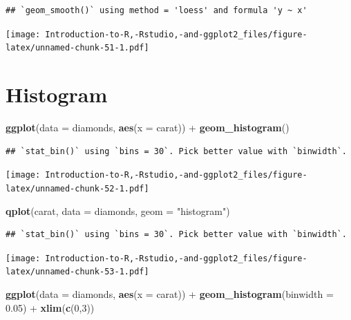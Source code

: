 \documentclass[]{book}
\newenvironment{Shaded}{\begin{snugshade}}{\end{snugshade}}
\newcommand{\KeywordTok}[1]{\textcolor[rgb]{0.13,0.29,0.53}{\textbf{{#1}}}}
\newcommand{\DataTypeTok}[1]{\textcolor[rgb]{0.13,0.29,0.53}{{#1}}}
\newcommand{\DecValTok}[1]{\textcolor[rgb]{0.00,0.00,0.81}{{#1}}}
\newcommand{\FloatTok}[1]{\textcolor[rgb]{0.00,0.00,0.81}{{#1}}}
\newcommand{\StringTok}[1]{\textcolor[rgb]{0.31,0.60,0.02}{{#1}}}
\newcommand{\NormalTok}[1]{{#1}}
\begin{document}
\begin{verbatim}
## `geom_smooth()` using method = 'loess' and formula 'y ~ x'
\end{verbatim}

\texttt{[image: Introduction-to-R,-Rstudio,-and-ggplot2\_files/figure-latex/unnamed-chunk-51-1.pdf]}

\section{Histogram}\label{histogram}

\begin{Shaded}
\begin{Highlighting}[]
\KeywordTok{ggplot}\NormalTok{(}\DataTypeTok{data =} \NormalTok{diamonds, }\KeywordTok{aes}\NormalTok{(}\DataTypeTok{x =} \NormalTok{carat)) +}\StringTok{ }\KeywordTok{geom_histogram}\NormalTok{()}
\end{Highlighting}
\end{Shaded}

\begin{verbatim}
## `stat_bin()` using `bins = 30`. Pick better value with `binwidth`.
\end{verbatim}

\texttt{[image: Introduction-to-R,-Rstudio,-and-ggplot2\_files/figure-latex/unnamed-chunk-52-1.pdf]}

\begin{Shaded}
\begin{Highlighting}[]
\KeywordTok{qplot}\NormalTok{(carat, }\DataTypeTok{data =} \NormalTok{diamonds, }\DataTypeTok{geom =} \StringTok{"histogram"}\NormalTok{)}
\end{Highlighting}
\end{Shaded}

\begin{verbatim}
## `stat_bin()` using `bins = 30`. Pick better value with `binwidth`.
\end{verbatim}

\texttt{[image: Introduction-to-R,-Rstudio,-and-ggplot2\_files/figure-latex/unnamed-chunk-53-1.pdf]}

\begin{Shaded}
\begin{Highlighting}[]
\KeywordTok{ggplot}\NormalTok{(}\DataTypeTok{data =} \NormalTok{diamonds, }\KeywordTok{aes}\NormalTok{(}\DataTypeTok{x =} \NormalTok{carat)) +}\StringTok{ }\KeywordTok{geom_histogram}\NormalTok{(}\DataTypeTok{binwidth =} \FloatTok{0.05}\NormalTok{) +}\StringTok{ }\KeywordTok{xlim}\NormalTok{(}\KeywordTok{c}\NormalTok{(}\DecValTok{0}\NormalTok{,}\DecValTok{3}\NormalTok{))}
\end{Highlighting}
\end{Shaded}
\end{document}
